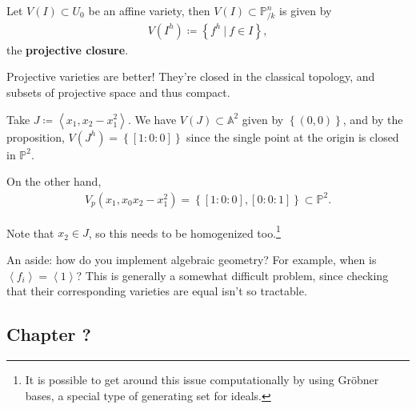 \begin{proposition}

Let \(V(I) \subset U_0\) be an affine variety, then
\(V(I) \subset {\mathbb{P}}^n_{/k}\) is given by
\begin{align*}
V(I^h) \coloneqq\left\{{f^h {~\mathrel{\Big|}~}f\in I}\right\}
,\end{align*}
the \textbf{projective closure}.

\end{proposition}

\begin{remark}

Projective varieties are better! They're closed in the classical
topology, and subsets of projective space and thus compact.

\end{remark}

\begin{warnings}

Take \(J \coloneqq\left\langle{x_1, x_2 - x_1^2}\right\rangle\). We have
\(V(J) \subset {\mathbb{A}}^2\) given by \(\left\{{(0, 0)}\right\}\),
and by the proposition, \(V(J^h) = \left\{{[1:0:0]}\right\}\) since the
single point at the origin is closed in \({\mathbb{P}}^2\).

On the other hand,
\begin{align*}  
V_p(x_1, x_0 x_2 - x_1^2) = \left\{{[1:0:0], [0:0:1]}\right\} \subset {\mathbb{P}}^2
.\end{align*}

Note that \(x_2 \in J\), so this needs to be homogenized too.\footnote{It
  is possible to get around this issue computationally by using Gröbner
  bases, a special type of generating set for ideals.}

\end{warnings}

\begin{remark}

An aside: how do you implement algebraic geometry? For example, when is
\(\left\langle{f_i}\right\rangle = \left\langle{1}\right\rangle\)? This
is generally a somewhat difficult problem, since checking that their
corresponding varieties are equal isn't so tractable.

\end{remark}

\hypertarget{chapter}{%
\subsection{Chapter ?}\label{chapter}}

